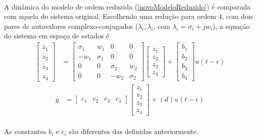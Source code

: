 \documentclass[a4paper,11pt]{scrartcl} %
\numberwithin{equation}{section} %
\numberwithin{figure}{section} %
\numberwithin{table}{section} %
\begin{document}
\paragraph{} A dinâmica do modelo de ordem reduzida (\ref{novoModeloReduzido}) é comparada com aquela do sistema original. Escolhendo uma redução para ordem 4, com dois pares de autovalores complexo-conjugados ($\lambda_i,\overline{\lambda}_i$, com $\lambda_i = \sigma_i + j w_i$), a equação do sistema em espaço de estados é \begin{align}
	\left[\begin{array}{c}
	\dot{z}_1\\ \dot{z}_2\\ \dot{z}_3\\ \dot{z}_4
	\end{array}\right] &= \left[\begin{array}{cccc}
	\sigma_1 & w_1 & 0 & 0\\ -w_1 & \sigma_1 & 0 & 0\\
	0 & 0 & \sigma_2 & w_2\\ 0 & 0 & -w_2 & \sigma_2
\end{array}\right] \left[\begin{array}{c}z_1\\ z_2\\ z_3\\ z_4\end{array}\right] + \left[\begin{array}{c}b_1\\ b_2\\ b_3\\ b_4\end{array}\right]u(t-\epsilon)
\end{align} \begin{align}
	y &= \left[\begin{array}{cccc}
	c_1 & c_2 & c_3 & c_4
\end{array}\right] \left[\begin{array}{c}
	z_1\\ z_2\\ z_3\\ z_4
\end{array}\right] + (d) u(t-\epsilon)
\end{align}

\paragraph{} As constantes $b_i$ e $c_i$ são diferentes das definidas anteriormente. %
\end{document}

